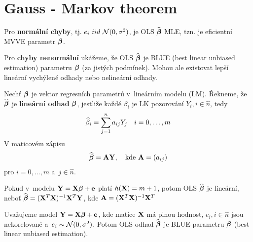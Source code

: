 \section{Gauss - Markov theorem}
Pro \textbf{normální chyby}, tj. $e_i~iid~\mathcal{N}(0,\sigma^2)$, je OLS $\widehat{\boldsymbol{\beta}}$ MLE, tzn. je eficientní MVVE parametr $\boldsymbol{\beta}$.

Pro \textbf{chyby nenormální} ukážeme, že OLS $\widehat{\boldsymbol{\beta}}$ je BLUE (best linear unbiased estimation) parametru $\boldsymbol{\beta}$ (za jistých podmínek). Mohou ale existovat lepší lineární vychýlené odhady nebo nelineární odhady.

\begin{define}
	Nechť $\boldsymbol{\beta}$ je vektor regresních parametrů v~lineárním modelu (LM). Řekneme, že $\widehat{\boldsymbol{\beta}}$ je \textbf{lineární odhad} $\boldsymbol{\beta}$, jestliže každé $\beta_i$ je LK pozorování $Y_i, i\in\widehat{n} $, tedy
	 $$
		\widehat{\beta}_i = \sum\limits_{j=1}^{n} a_{ij} Y_j \quad i = 0,\dots,m
	 $$
V maticovém zápisu
	 $$
		\widehat{\boldsymbol{\beta}} = \textbf{A} \mathbf{Y}, \quad \text{kde } \textbf{A} = (a_{ij})
	 $$
pro $i = 0,\dots, m$ a~$j  \in\widehat{n} $.
\end{define}
\begin{remark}
 Pokud v~modelu $\mathbf{Y} = \mathbf{X} \boldsymbol{\beta} + \mathbf{e}$ platí $h(\mathbf{X}) = m+1$, potom OLS $\widehat{\boldsymbol{\beta}}$ je lineární, neboť $\widehat{\boldsymbol{\beta}} = (\mathbf{X}^T \mathbf{X})^{-1} \mathbf{X}^T \mathbf{Y}$, kde $\textbf{A} = (\mathbf{X}^T \mathbf{X})^{-1} \mathbf{X}^T$
\end{remark}
\begin{theorem}
	Uvažujeme model $\mathbf{Y} = \mathbf{X} \boldsymbol{\beta} + \mathbf{e}$, kde matice $\mathbf{X}$ má plnou hodnost, $e_i, i\in\widehat{n} $ jsou nekorelované a~$e_i \sim \mathcal{N}(0, \sigma^2)$. Potom OLS odhad $\widehat{\boldsymbol{\beta}}$ je BLUE parametru $\boldsymbol{\beta}$ (best linear unbiased estimation).
\end{theorem}
